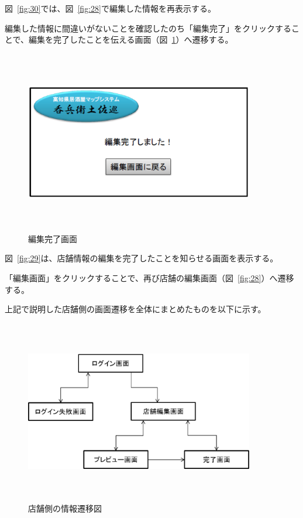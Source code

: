\documentclass[a4j,titlepage]{jarticle}
\begin{document}
\clearpage
図~\ref{fig:30}では、図~\ref{fig:28}で編集した情報を再表示する。



編集した情報に間違いがないことを確認したのち「編集完了」をクリックすることで、編集を完了したことを伝える画面（図~\ref{fig:31}）へ遷移する。



\begin {figure}[!htbp]
    \begin{center}
    \includegraphics [height=8cm, width=10cm]{31.eps}
    \caption {編集完了画面}
    \label {fig:31}
    \end{center}
\end {figure}



図~\ref{fig:29}は、店舗情報の編集を完了したことを知らせる画面を表示する。



「編集画面」をクリックすることで、再び店舗の編集画面（図~\ref{fig:28}）へ遷移する。
\clearpage

上記で説明した店舗側の画面遷移を全体にまとめたものを以下に示す。
\begin {figure}[!htbp]
    \begin{center}
    \includegraphics [height=8cm, width=10cm]{32.eps}
    \caption {店舗側の情報遷移図}
    \label {fig:32}
    \end{center}
\end {figure}
\end{document}
